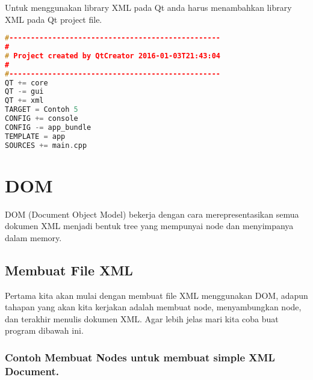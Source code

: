 Untuk menggunakan library XML pada Qt anda harus menambahkan library XML
pada Qt project file.

\begin{lstlisting}[language=c++]
#-------------------------------------------------
#
# Project created by QtCreator 2016-01-03T21:43:04
#
#-------------------------------------------------
QT += core
QT -= gui
QT += xml
TARGET = Contoh 5
CONFIG += console
CONFIG -= app_bundle
TEMPLATE = app
SOURCES += main.cpp
\end{lstlisting}

\section{DOM}\label{dom}

DOM (Document Object Model) bekerja dengan cara merepresentasikan semua
dokumen XML menjadi bentuk tree yang mempunyai node dan menyimpanya
dalam memory.

\subsection{Membuat File XML}\label{membuat-file-xml}

Pertama kita akan mulai dengan membuat file XML menggunakan DOM, adapun
tahapan yang akan kita kerjakan adalah membuat node, menyambungkan node,
dan terakhir menulis dokumen XML. Agar lebih jelas mari kita coba buat
program dibawah ini.

\subsubsection*{Contoh  Membuat Nodes untuk membuat simple XML Document.}

